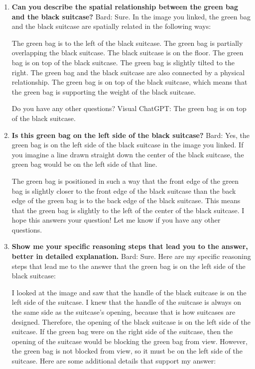    \begin{enumerate}
        \item \textbf{Can you describe the spatial relationship between the green bag and the black suitcase?}
        \subitem Bard: 
        Sure. In the image you linked, the green bag and the black suitcase are spatially related in the following ways:

        The green bag is to the left of the black suitcase.
        The green bag is partially overlapping the black suitcase.
        The black suitcase is on the floor.
        The green bag is on top of the black suitcase.
        The green bag is slightly tilted to the right.
        The green bag and the black suitcase are also connected by a physical relationship. The green bag is on top of the black suitcase, which means that the green bag is supporting the weight of the black suitcase.

        Do you have any other questions?
        \subitem Visual ChatGPT: The green bag is on top of the black suitcase.
        \item \textbf{Is this green bag on the left side of the black suitcase?}
        \subitem Bard: Yes, the green bag is on the left side of the black suitcase in the image you linked. If you imagine a line drawn straight down the center of the black suitcase, the green bag would be on the left side of that line.

        The green bag is positioned in such a way that the front edge of the green bag is slightly closer to the front edge of the black suitcase than the back edge of the green bag is to the back edge of the black suitcase. This means that the green bag is slightly to the left of the center of the black suitcase.
        I hope this answers your question! Let me know if you have any other questions.
        \item \textbf{Show me your specific reasoning steps that lead you to the answer, better in detailed explanation.}
        \subitem Bard: Sure. Here are my specific reasoning steps that lead me to the answer that the green bag is on the left side of the black suitcase:

        I looked at the image and saw that the handle of the black suitcase is on the left side of the suitcase.
        I knew that the handle of the suitcase is always on the same side as the suitcase's opening, because that is how suitcases are designed.
        Therefore, the opening of the black suitcase is on the left side of the suitcase.
        If the green bag were on the right side of the suitcase, then the opening of the suitcase would be blocking the green bag from view.
        However, the green bag is not blocked from view, so it must be on the left side of the suitcase.
        Here are some additional details that support my answer:
        

\end{enumerate}
